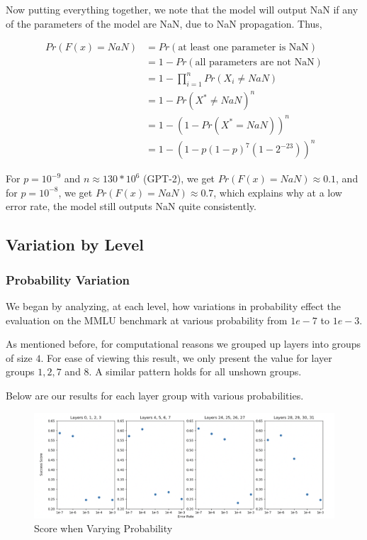 Now putting everything together, we note that the model will output NaN if any of the parameters of the model are NaN, due to NaN propagation. Thus,

\begin{align*}
	Pr(F(x) = NaN) &= Pr(\text{at least one parameter is NaN}) \\
	&= 1 - Pr(\text{all parameters are not NaN}) \\
	&= 1 - \prod_{i=1}^n Pr(X_i \neq NaN) \\
	&= 1 - Pr(X^* \neq NaN)^n \\
	&= 1 - (1 - Pr(X^* = NaN))^n \\
	&= 1 - (1 - p(1 - p)^7(1 - 2^{-23}))^n
\end{align*}

For $p = 10^{-9}$ and $n \approx 130 * 10^6$ (GPT-2), we get $Pr(F(x) = NaN) \approx 0.1$, and for $p = 10^{-8}$, we get $Pr(F(x) = NaN) \approx 0.7$, which explains why at a low error rate, the model still outputs NaN quite consistently.

\subsection{Variation by Level}

\subsubsection{Probability Variation}
We began by analyzing, at each level, how variations in probability effect the evaluation on the MMLU benchmark at various probability from $1e-7$ to $1e-3$.

As mentioned before, for computational reasons we grouped up layers into groups of size $4$. For ease of viewing this result, we only present the value for layer groups $1, 2, 7$ and $8$. A similar pattern
holds for all unshown groups.

Below are our results for each layer group with various probabilities.

\begin{figure}[!htbp]
    \centering
    \includegraphics[width=1.0\linewidth]{images/varyprob.png}
    \caption{Score when Varying Probability}
    \label{fig:varyprob}
\end{figure}

